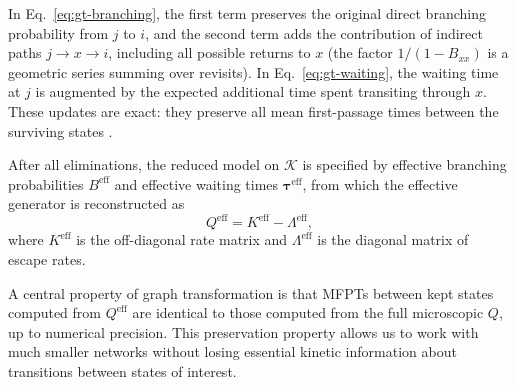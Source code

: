 In Eq.~\eqref{eq:gt-branching}, the first term preserves the original direct branching
probability from $j$ to $i$, and the second term adds the contribution of indirect
paths $j \to x \to i$, including all possible returns to $x$ (the factor
$1/(1-B_{xx})$ is a geometric series summing over revisits). In
Eq.~\eqref{eq:gt-waiting}, the waiting time at $j$ is augmented by the expected
additional time spent transiting through $x$. These updates are exact: they preserve
all mean first-passage times between the surviving states
\cite{Trygubenko2006GT,Stevenson2014GT}.

After all eliminations, the reduced model on $\mathcal{K}$ is specified by effective
branching probabilities $B^{\mathrm{eff}}$ and effective waiting times
$\boldsymbol{\tau}^{\mathrm{eff}}$, from which the effective generator is
reconstructed as
\begin{equation}\label{eq:Qeff}
  Q^{\mathrm{eff}} = K^{\mathrm{eff}} - \Lambda^{\mathrm{eff}},
\end{equation}
where $K^{\mathrm{eff}}$ is the off-diagonal rate matrix and
$\Lambda^{\mathrm{eff}}$ is the diagonal matrix of escape rates.

A central property of graph transformation is that MFPTs between kept states computed
from $Q^{\mathrm{eff}}$ are identical to those computed from the full microscopic $Q$,
up to numerical precision. This preservation property allows us to work with much
smaller networks without losing essential kinetic information about transitions between
states of interest.

